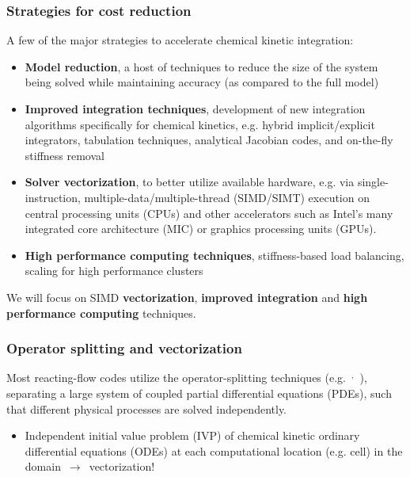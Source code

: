 \documentclass{beamer}
\newcounter{expensive}
\newcommand\ExpTitle{%
  \frametitle{\refstepcounter{expensive}{Chemical kinetic integration is \textbf{expensive}}~\theexpensive}}
\newcounter{stiff}
\begin{document}


\begin{frame}
 \frametitle{Strategies for cost reduction}
 A few of the major strategies to accelerate chemical kinetic integration:
 \begin{itemize}
  \item \textbf{Model reduction}, a host of techniques to reduce the size of the system being solved while maintaining accuracy (as compared to the full model)
  \item \textbf{Improved integration techniques}, development of new integration algorithms specifically for chemical kinetics, e.g. hybrid implicit\slash explicit integrators, tabulation techniques, analytical Jacobian codes, and on-the-fly stiffness removal
  \item \textbf{Solver vectorization}, to better utilize available hardware, e.g. via single-instruction, multiple-data\slash multiple-thread (SIMD\slash SIMT) execution on central processing units (CPUs) and other accelerators such as Intel's many integrated core architecture (MIC) or graphics processing units (GPUs).
  \item \textbf{High performance computing techniques}, stiffness-based load balancing, scaling for high performance clusters
 \end{itemize}
 We will focus on SIMD \textbf{vectorization}, \textbf{improved integration} and \textbf{high performance computing} techniques.
\end{frame}

\begin{frame}
 \frametitle{Operator splitting and vectorization}
 Most reacting-flow codes utilize the operator-splitting techniques (e.g.~$^{,}$~), separating a large system of coupled partial differential equations (PDEs), such that different physical processes are solved independently.
 \begin{itemize}
  \item Independent initial value problem (IVP) of chemical kinetic ordinary differential equations (ODEs) at each computational location (e.g. cell) in the domain~$\rightarrow$~vectorization!
 \end{itemize}

\end{frame}
\end{document}
